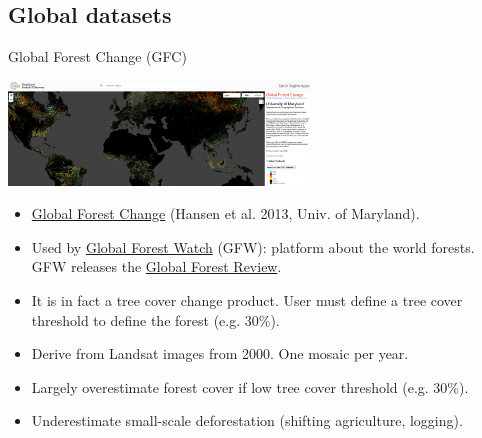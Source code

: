 \documentclass[10pt,table,dvipsnames,compress]{beamer}
\begin{document}
\subsection{Global datasets}
\label{sec:orgc348d98}

\begin{frame}[label={sec:org8a69ad9}]{Global Forest Change (GFC)}
\begin{center}
\includegraphics[width=8cm]{figs/fcc/gfc.png}
\end{center}

\begin{itemize}
\item \href{https://glad.earthengine.app/view/global-forest-change}{Global Forest Change} (Hansen et al. 2013, Univ. of Maryland).
\item Used by \href{https://www.globalforestwatch.org/}{Global Forest Watch} (GFW): platform about the world forests. GFW releases the \href{https://research.wri.org/gfr/global-forest-review}{Global Forest Review}.
\item It is in fact a tree cover change product. User must define a tree cover threshold to define the forest (e.g. 30\%).
\item Derive from Landsat images from 2000. One mosaic per year.
\item Largely overestimate forest cover if low tree cover threshold (e.g. 30\%).
\item Underestimate small-scale deforestation (shifting agriculture, logging).
\end{itemize}
\end{frame}
\end{document}
